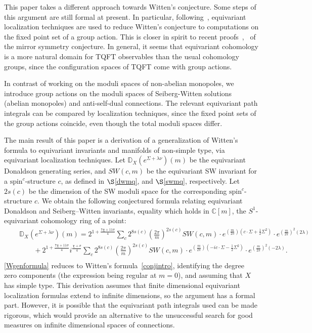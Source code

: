 \documentclass[a4paper,12pt,reqno,sumlimits]{amsart}
\theoremstyle{plain}
\theoremstyle{definition}
\newcommand{\C}{{\mathbb C}}
\newcommand{\D}{{\mathbb D}}
\newcommand{\1}{{\bf 1}}
\newcommand{\spinc}{$\text{spin}^c$}
\numberwithin{equation}{section}
\begin{document}
This paper takes a different approach towards Witten's conjecture.  Some
steps of this argument are still formal at present.  In particular,
following~\cite{radu}, equivariant localization techniques are used to reduce
Witten's conjecture to computations on the fixed point set of a group action.
This is closer in spirit to recent proofs~\cite{givental},~\cite{lly} of the
mirror symmetry conjecture.  In general, it seems that equivariant cohomology
is a more natural domain for TQFT observables than the usual cohomology
groups, since the configuration spaces of TQFT come with group actions.

In contrast of working on the moduli spaces of non-abelian monopoles, we
introduce group actions on the moduli spaces of Seiberg-Witten solutions
(abelian monopoles) and anti-self-dual connections.  The relevant equivariant
path integrals can be compared by localization techniques, since the fixed
point sets of the group actions coincide, even though the total moduli spaces
differ.

The main result of this paper is a derivation of a generalization of Witten's
formula to equivariant invariants and manifolds of non-simple type, via
equivariant localization techniques. Let
$\D_X\left(e^{\Sigma+\lambda\nu}\right)(m)$ be the equivariant Donaldson
generating series, and $SW(c,m)$ be the equivariant SW invariant for a
\spinc-structure $c$, as defined in $\S$\ref{dwmq}, and $\S$\ref{swmq},
respectively. Let $2s(c)$ be the dimension of the SW moduli space for the
corresponding \spinc-structure $c$. We obtain the following conjectured
formula relating equivariant Donaldson and Seiberg--Witten invariants,
equality which holds in $\C[m]$, the $S^1$-equivariant cohomology ring of a
point:
\begin{eqnarray}
  \label{Wgenformula}
  &&\D_X\left(e^{\Sigma+\lambda\nu}\right)(m) = 2^{1+\frac{7\chi+11\sigma}{4}}
  \sum_c 2^{8s(c)}\left(\frac{2\pi}{m}\right)^{2s(c)}
  SW(c,m)\cdot e^{\left(\frac{m}{2\pi}\right)(c\cdot\Sigma+\frac{1}{2}\Sigma^2)}
  \cdot e^{\left(\frac{m}{2\pi}\right)^2 (2\lambda)}\nonumber\\
  &&\qquad +2^{1+\frac{7\chi+11\sigma}{4}} i^{\frac{\chi+\sigma}{4}}
  \sum_c 2^{8s(c)}\left(\frac{2\pi}{m}\right)^{2s(c)}
  SW(c,m)\cdot e^{\left(\frac{m}{2\pi}\right)(-ic\cdot\Sigma-\frac{1}{2}\Sigma^2)}
  \cdot e^{\left(\frac{m}{2\pi}\right)^2 (-2\lambda)}.\nonumber\\
  \,
\end{eqnarray}
\eqref{Wgenformula} reduces to Witten's formula~\eqref{conjintro},
identifying the degree zero components (the expression being regular at
$m=0$), and assuming that $X$ has simple type.  This derivation assumes that
finite dimensional equivariant localization formulas extend to infinite
dimensions, so the argument has a formal part.  However, it is possible that
the equivariant path integrals used can be made rigorous, which would provide
an alternative to the unsuccessful search for good measures on infinite
dimensional spaces of connections.
\end{document}
